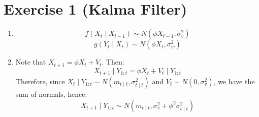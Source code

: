 \documentclass[12pt,letterpaper]{article}
\begin{document}

\section*{Exercise 1 (Kalma Filter)}
\begin{enumerate}[leftmargin=!,labelindent=5pt]
\item 
$$
f(X_t \mid X_{t-1}) \sim N(\phi X_{t-1}, \sigma_v^2)
$$
$$
g(Y_t \mid X_{t}) \sim N(\phi X_{t}, \sigma_w^2)
$$

\item Note that $X_{t+1} = \phi X_t + V_t$. Then:
$$
X_{t+1} \mid Y_{1:t} = \phi X_t + V_t \mid Y_{1:t}
$$
Therefore, since
$X_t \mid Y_{1:t} \sim N(m_{t\mid t}, \sigma^2_{t\mid t})$ and
$V_t \sim N(0, \sigma_v^2)$, we have the sum of normals, hence:
$$
X_{t+1} \mid Y_{1:t} \sim N(m_{t\mid t}, \sigma_v^2 +
\phi^2 \sigma^2_{t\mid t})
$$


\end{enumerate}
\end{document}
